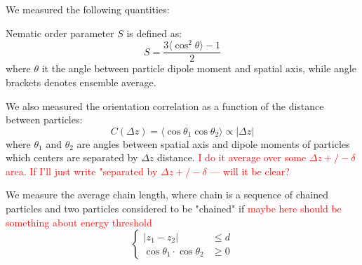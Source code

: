 We measured the following quantities:

Nematic order parameter $S$ is defined as:
\begin{equation}
\label{eq:nematic_order_parameter}
	S = \frac{3 \langle\cos^2 \theta\rangle - 1}{2}
\end{equation}
where $\theta$ it the angle between particle dipole moment and spatial axis, while angle brackets denotes ensemble average.

We also measured the orientation correlation as a function of the distance between particles:
\begin{equation}
	C(\Delta z) = \langle\cos \theta_1 \cos \theta_2\rangle \propto |\Delta z|
\end{equation}
where $\theta_1$ and $\theta_2$ are angles between spatial axis and dipole moments of particles which centers are separated by $\Delta z$ distance. \textcolor{red}{I do it average over some $\Delta z +/- \delta$ area. If I'll just write "separated by $\Delta z +/- \delta$ --- will it be clear?}

We measure the average chain length, where chain is a sequence of chained particles and two particles considered to be "chained" if 
\textcolor{red}{maybe here should be something about energy threshold}
\begin{equation}
\begin{cases}
	|z_1 - z_2| &\leq d \\
	\cos \theta_1 \cdot \cos \theta_2 &\geq 0
\end{cases}
\end{equation}